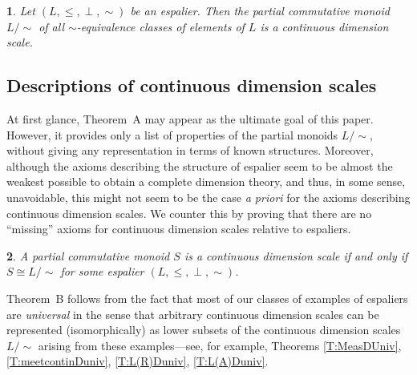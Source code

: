 \documentclass[psamsfonts,reqno]{memo-l}
\theoremstyle{plain}
\newtheorem*{stat}{\name}
\newcommand{\name}{testing}
\theoremstyle{definition}
\theoremstyle{remark}
\newenvironment{all}[1]{\renewcommand{\name}{#1}\begin{stat}}
                          {\end{stat}}
\numberwithin{equation}{section}
\newcommand{\pcm}{partial commutative mon\-oid}
\begin{document}
\begin{all}{Theorem A}
Let $(L,\leq,\perp,\sim)$ be an espalier. Then the
\pcm{}\ $L/{\sim}$ of all
$\sim$-equivalence classes of elements of $L$ is a continuous dimension
scale.
\end{all}

\subsection*{Descriptions of continuous dimension
scales}
At first glance, Theorem~A may
appear as the ultimate goal of this paper. However, it provides only a
list of properties of the partial monoids
$L/{\sim}$, without giving any representation in terms of known structures.
Moreover, although the axioms describing the structure of espalier seem to
be almost the weakest possible to obtain a complete dimension theory, and
thus, in some sense, unavoidable, this might not seem to be
the case \emph{a priori} for the axioms describing continuous dimension
scales. We counter this by proving that
there are no ``missing'' axioms for continuous dimension
scales relative to espaliers.

\begin{all}{Theorem B}
A partial commutative monoid $S$ is a continuous dimension scale if and
only if $S\cong L/{\sim}$ for some espalier
$(L,\leq,\perp,\sim)$.
\end{all}

\noindent Theorem~B follows from the fact that most
of our classes of examples of espaliers are
\emph{universal} in the sense that arbitrary continuous dimension
scales can be represented
(isomorphically) as lower subsets of the continuous dimension scales
$L/{\sim}$ arising from these examples---see, for example, Theorems
\ref{T:MeasDUniv}, \ref{T:meetcontinDuniv}, \ref{T:L(R)Duniv},
\ref{T:L(A)Duniv}.
\end{document}
